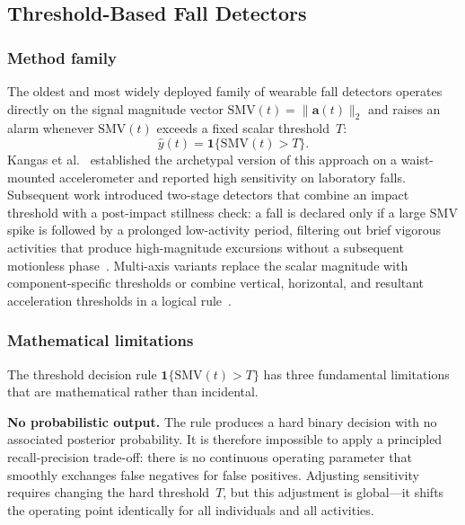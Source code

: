 \documentclass[onluarkali,ingilizce,yukseklisans,karton,LisansustuEgitim]{itutez}
\providecommand{\1}{\mathbf{1}}
\begin{document}
\subsection{Threshold-Based Fall Detectors}
\label{subsec:rw-threshold}

\subsubsection{Method family}

The oldest and most widely deployed family of wearable fall detectors operates
directly on the signal magnitude vector
$\mathrm{SMV}(t)=\|\mathbf{a}(t)\|_2$
and raises an alarm whenever $\mathrm{SMV}(t)$ exceeds a fixed scalar threshold~$T$:
\[
  \widehat y(t) = \mathbf{1}\{\mathrm{SMV}(t) > T\}.
\]
Kangas et al.~\parencite{kangas2008fall} established the archetypal version of this
approach on a waist-mounted accelerometer and reported high sensitivity on laboratory
falls.  Subsequent work introduced two-stage detectors that combine an impact
threshold with a post-impact stillness check: a fall is declared only if a large
$\mathrm{SMV}$ spike is followed by a prolonged low-activity period, filtering out
brief vigorous activities that produce high-magnitude excursions without a subsequent
motionless phase~\parencite{igual2013challenges}.  Multi-axis variants replace the scalar
magnitude with component-specific thresholds or combine vertical, horizontal, and
resultant acceleration thresholds in a logical rule~\parencite{delahoz2014survey}.

\subsubsection{Mathematical limitations}

The threshold decision rule $\mathbf{1}\{\mathrm{SMV}(t) > T\}$ has three
fundamental limitations that are mathematical rather than incidental.

\textbf{No probabilistic output.}  The rule produces a hard binary decision with
no associated posterior probability.  It is therefore impossible to apply a
principled recall-precision trade-off: there is no continuous operating parameter
that smoothly exchanges false negatives for false positives.  Adjusting sensitivity
requires changing the hard threshold~$T$, but this adjustment is global---it shifts
the operating point identically for all individuals and all activities.
\end{document}
